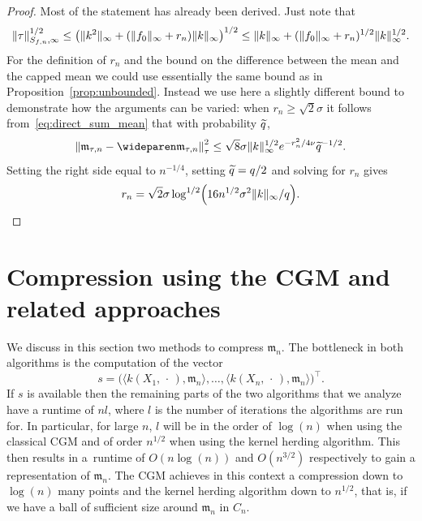 \documentclass[10pt]{amsart}
\theoremstyle{definition}\newtheorem{defi}[theo]{Definition}\newtheorem{rema}[theo]{Remark}\newtheorem{exam}[theo]{Example}\newtheorem{exem}[theo]{Example}\newtheorem{nota}[theo]{Notation}
\theoremstyle{remark}
\newcommand{\mean}{\mathfrak{m}}
\let\oldtilde\tilde
\renewcommand*{\tilde}[1]{\mathchoice{\widetilde{#1}}{\widetilde{#1}}{\oldtilde{#1}}{\oldtilde{#1}}}
\let\originalleft\left
\let\originalright\right
\renewcommand{\left}{\mathopen{}\mathclose\bgroup\originalleft}
\renewcommand{\right}{\aftergroup\egroup\originalright}
\begin{document}
\begin{proof}
Most of the statement has already been derived. Just note that
\[
\|\tau\|_{S_{f,n},\infty}^{1/2}
\leq \left(\|k^2\|_\infty + (\|f_0\|_\infty + r_n) \|k\|_\infty\right)^{1/2} \leq \|k\|_\infty + (\|f_0\|_\infty + r_n)^{1/2} \|k\|_\infty^{1/2}.
\]
For the definition of $r_n$ and the bound on the difference between the mean and the capped mean we could use essentially the same bound as in Proposition~\ref{prop:unbounded}. Instead we use here a slightly different bound to demonstrate how the arguments can be varied: when $r_n \geq \sqrt{2} \sigma$ it follows from~\eqref{eq:direct_sum_mean} that with probability $\tilde q$,
\[
\left\| \mean_{\tau,n} - \wideparen \mean_{\tau,n} \right\|^2_\tau \leq \sqrt{8} \sigma \|k\|^{1/2}_\infty e^{-r_n^2/4 \nu}
\tilde q^{-1/2}.
\]
Setting the right side equal to $n^{-1/4}$, setting $\tilde q = q/2$ and solving for $r_n$ gives
\[
r_n =\sqrt{2} \sigma \log^{1/2}\left(16 n^{1/2} \sigma^2 \|k\|_\infty/ q\right).\qedhere
\]
\end{proof}



\section{Compression using the CGM and related approaches} \label{sec:algorithms}
We discuss in this section two methods to compress $\mean_n$. The bottleneck in both algorithms is the computation of the vector
\[
s = \bigl(\langle k(X_1,\,\cdot\,), \mean_n \rangle, \dots, \langle k(X_n,\,\cdot\,), \mean_n \rangle\bigr)^\top.
\]
If $s$ is available then the remaining parts of the two algorithms that we analyze have a runtime of $n l$, where $l$ is the number of iterations the algorithms are run for. In particular, for large $n$, $l$ will be in the order of $\log(n)$ when using the classical CGM and of order $n^{1/2}$ when using the kernel herding algorithm. This then results in a~runtime of $O(n \log(n))$ and $O(n^{3/2})$ respectively to gain a representation of $\mean_n$. The CGM achieves in this context a compression down to $\log(n)$ many points and the kernel herding algorithm down to $n^{1/2}$, that is, if we have a ball of sufficient size around $\mean_n$ in $C_n$.
\end{document}
